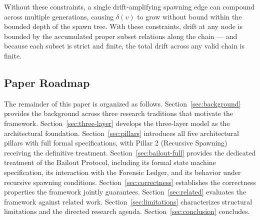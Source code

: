 Without these constraints, a single drift-amplifying spawning edge can compound across multiple generations, causing $\delta(v)$ to grow without bound within the bounded depth of the spawn tree. With these constraints, drift at any node is bounded by the accumulated proper subset relations along the chain — and because each subset is strict and finite, the total drift across any valid chain is finite.

\subsection{Paper Roadmap}

The remainder of this paper is organized as follows. Section~\ref{sec:background} provides the background across three research traditions that motivate the framework. Section~\ref{sec:three-layer} develops the \bxthree{} three-layer model as the architectural foundation. Section~\ref{sec:pillars} introduces all five architectural pillars with full formal specifications, with Pillar 2 (Recursive Spawning) receiving the definitive treatment. Section~\ref{sec:bailout-full} provides the dedicated treatment of the Bailout Protocol, including its formal state machine specification, its interaction with the Forensic Ledger, and its behavior under recursive spawning conditions. Section~\ref{sec:correctness} establishes the correctness properties the framework jointly guarantees. Section~\ref{sec:related} evaluates the framework against related work. Section~\ref{sec:limitations} characterizes structural limitations and the directed research agenda. Section~\ref{sec:conclusion} concludes.
